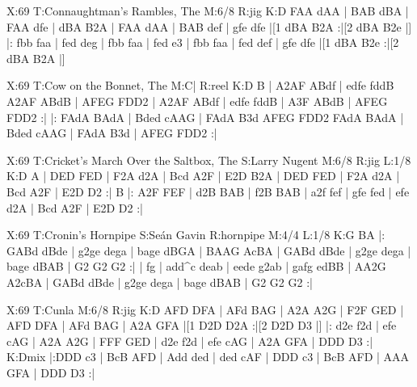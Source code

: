 \documentclass{article}
\begin{document}
\begin{abc}[name]
X:69
T:Connaughtman's Rambles, The
M:6/8
R:jig
K:D
FAA dAA | BAB dBA | FAA dfe | dBA B2A |
FAA dAA | BAB def | gfe dfe |[1 dBA B2A :|[2 dBA B2e |]
|: fbb faa | fed deg | fbb faa | fed e3 |
fbb faa | fed def | gfe dfe |[1 dBA B2e :|[2 dBA B2A |]
\end{abc}

\begin{abc}[name]
X:69
T:Cow on the Bonnet, The
M:C|
R:reel
K:D
B | A2AF ABdf | edfe fddB A2AF ABdB | AFEG FDD2 |
A2AF ABdf | edfe fddB | A3F ABdB | AFEG FDD2 :|
|: FAdA BAdA | Bded cAAG | FAdA B3d AFEG FDD2
FAdA BAdA | Bded cAAG | FAdA B3d | AFEG FDD2 :|
\end{abc}

\begin{abc}[name]
X:69
T:Cricket's March Over the Saltbox, The
S:Larry Nugent
M:6/8
R:jig
L:1/8
K:D
A | DED FED | F2A d2A | Bcd A2F | E2D B2A |
DED FED | F2A d2A | Bcd A2F | E2D D2 :|
B |: A2F FEF | d2B BAB | f2B BAB | a2f fef |
gfe fed | efe d2A | Bcd A2F | E2D D2 :|
\end{abc}

\begin{abc}[name]
X:69
T:Cronin's Hornpipe
S:Seán Gavin
R:hornpipe
M:4/4
L:1/8
K:G
BA |: GABd dBde | g2ge dega | bage dBGA | BAAG AcBA |
GABd dBde | g2ge dega | bage dBAB | G2 G2 G2 :|
| fg | add^c deab | eede g2ab | gafg edBB | AA2G A2cBA |
GABd dBde | g2ge dega | bage dBAB | G2 G2 G2 :|
\end{abc}

\begin{abc}[name]
X:69
T:Cunla
M:6/8
R:jig
K:D
AFD DFA | AFd BAG | A2A A2G | F2F GED |
AFD DFA | AFd BAG | A2A GFA |[1 D2D D2A :|[2 D2D D3 |]
|: d2e f2d | efe cAG | A2A A2G | FFF GED |
d2e f2d | efe cAG | A2A GFA | DDD D3 :|
K:Dmix
|:DDD c3 | BcB AFD | Add ded | ded cAF |
DDD c3 | BcB AFD | AAA GFA | DDD D3 :|
\end{abc}
\end{document}
